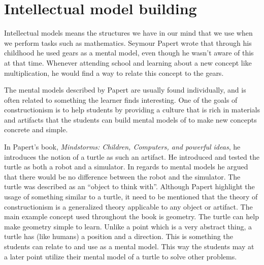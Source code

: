 
\section{Intellectual model building}
Intellectual models means the structures we have in our mind that we use when we perform tasks such as mathematics. Seymour Papert wrote that through his childhood he used gears as a mental model, even though he wasn't aware of this at that time. Whenever attending school and learning about a new concept like multiplication, he would find a way to relate this concept to the gears. 

\bigskip\noindent
The mental models described by Papert are usually found individually, and is often related to something the learner finds interesting. 
One of the goals of constructionism is to help students by providing a culture that is rich in materials and artifacts that the students can build mental models of to make new concepts concrete and simple. 

\bigskip\noindent
In Papert's book, \textit{Mindstorms: Children, Computers, and powerful ideas}\cite{papert1980mindstorms}, he introduces the notion of a turtle as such an artifact. 
He introduced and tested the turtle as both a robot and a simulator. In regards to mental models he argued that there would be no difference between the robot and the simulator. The turtle was described as an ``object to think with''. Although Papert highlight the usage of something similar to a turtle, it need to be mentioned that the theory of constructionism is a generalized theory applicable to any object or artifact. 
The main example concept used throughout the book is geometry. The turtle can help make geometry simple to learn. Unlike a point which is a very abstract thing, a turtle has (like humans) a position and a direction. 
This is something the students can relate to and use as a mental model. 
This way the students may at a later point utilize their mental model of a turtle to solve other problems. 

